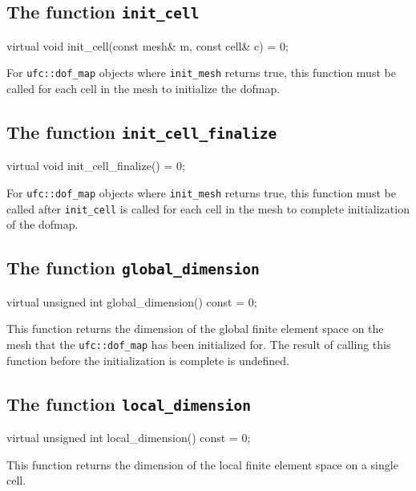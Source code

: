 \subsection{The function \texttt{init\_cell}}

\begin{code}
virtual void init_cell(const mesh& m,
                       const cell& c) = 0;
\end{code}

For \texttt{ufc::dof\_map} objects where \texttt{init\_mesh} returns true,
this function must be called for each cell in the mesh to initialize
the dofmap.

\subsection{The function \texttt{init\_cell\_finalize}}

\begin{code}
virtual void init_cell_finalize() = 0;
\end{code}

For \texttt{ufc::dof\_map} objects where \texttt{init\_mesh} returns
true, this function must be called after \texttt{init\_cell} is called
for each cell in the mesh to complete initialization of the dofmap.

\subsection{The function \texttt{global\_dimension}}

\begin{code}
virtual unsigned int global_dimension() const = 0;
\end{code}

This function returns the dimension of the global finite element space
on the mesh that the \texttt{ufc::dof\_map} has been initialized
for. The result of calling this function before the initialization is
complete is undefined.

\subsection{The function \texttt{local\_dimension}}

\begin{code}
virtual unsigned int local_dimension() const = 0;
\end{code}

This function returns the dimension of the local finite element space
on a single cell.

